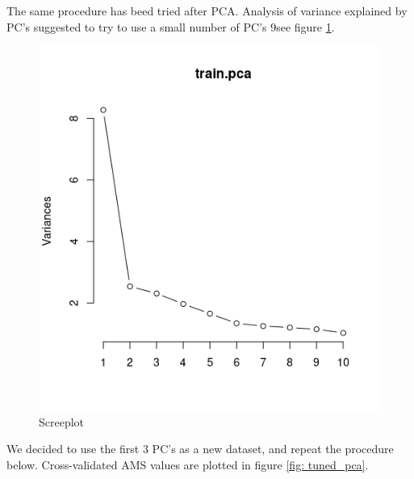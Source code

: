 \documentclass[]{article}
\begin{document}
The same procedure has beed tried after PCA. Analysis of variance explained by PC's suggested to try to use a small number of PC's 9see figure \ref{fig: screeplot}.
\begin{figure}[H]
\centering
\label{fig: screeplot}
\includegraphics[scale=0.7]{../Pictures/trainpcascreeplot.png} 
\caption{Screeplot}
\end{figure}

We decided to use the first $3$ PC's as a new dataset, and repeat the procedure below. Cross-validated AMS values are plotted in figure \ref{fig: tuned_pca}.
\end{document}
